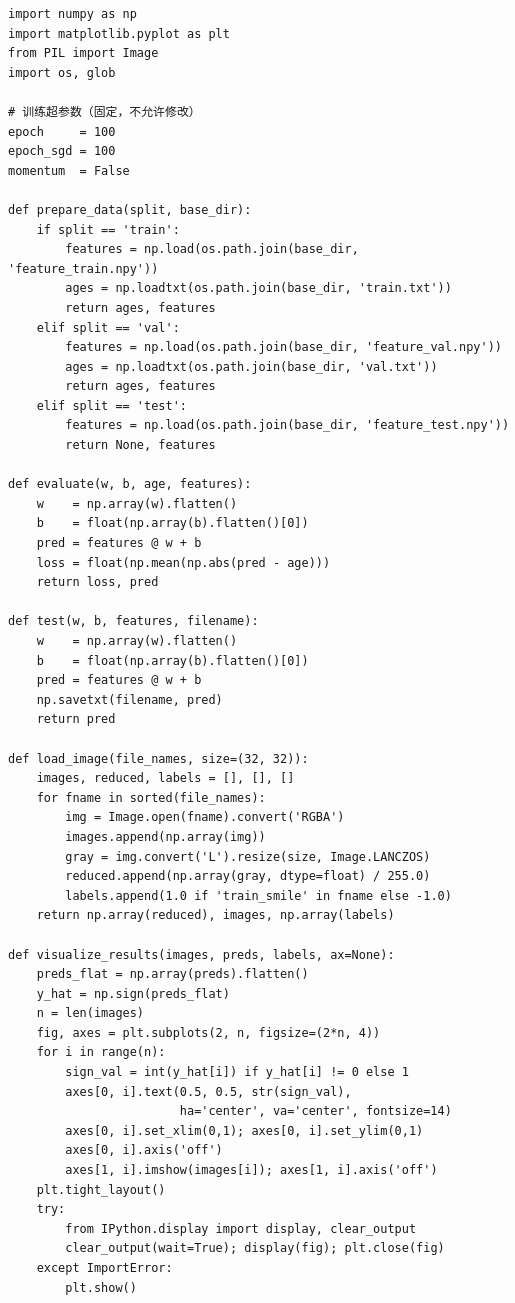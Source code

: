 \documentclass[12pt,a4paper]{ctexart}
\begin{document}
\begin{lstlisting}
import numpy as np
import matplotlib.pyplot as plt
from PIL import Image
import os, glob

# 训练超参数（固定，不允许修改）
epoch     = 100
epoch_sgd = 100
momentum  = False

def prepare_data(split, base_dir):
    if split == 'train':
        features = np.load(os.path.join(base_dir, 'feature_train.npy'))
        ages = np.loadtxt(os.path.join(base_dir, 'train.txt'))
        return ages, features
    elif split == 'val':
        features = np.load(os.path.join(base_dir, 'feature_val.npy'))
        ages = np.loadtxt(os.path.join(base_dir, 'val.txt'))
        return ages, features
    elif split == 'test':
        features = np.load(os.path.join(base_dir, 'feature_test.npy'))
        return None, features

def evaluate(w, b, age, features):
    w    = np.array(w).flatten()
    b    = float(np.array(b).flatten()[0])
    pred = features @ w + b
    loss = float(np.mean(np.abs(pred - age)))
    return loss, pred

def test(w, b, features, filename):
    w    = np.array(w).flatten()
    b    = float(np.array(b).flatten()[0])
    pred = features @ w + b
    np.savetxt(filename, pred)
    return pred

def load_image(file_names, size=(32, 32)):
    images, reduced, labels = [], [], []
    for fname in sorted(file_names):
        img = Image.open(fname).convert('RGBA')
        images.append(np.array(img))
        gray = img.convert('L').resize(size, Image.LANCZOS)
        reduced.append(np.array(gray, dtype=float) / 255.0)
        labels.append(1.0 if 'train_smile' in fname else -1.0)
    return np.array(reduced), images, np.array(labels)

def visualize_results(images, preds, labels, ax=None):
    preds_flat = np.array(preds).flatten()
    y_hat = np.sign(preds_flat)
    n = len(images)
    fig, axes = plt.subplots(2, n, figsize=(2*n, 4))
    for i in range(n):
        sign_val = int(y_hat[i]) if y_hat[i] != 0 else 1
        axes[0, i].text(0.5, 0.5, str(sign_val),
                        ha='center', va='center', fontsize=14)
        axes[0, i].set_xlim(0,1); axes[0, i].set_ylim(0,1)
        axes[0, i].axis('off')
        axes[1, i].imshow(images[i]); axes[1, i].axis('off')
    plt.tight_layout()
    try:
        from IPython.display import display, clear_output
        clear_output(wait=True); display(fig); plt.close(fig)
    except ImportError:
        plt.show()
\end{lstlisting}
\end{document}
